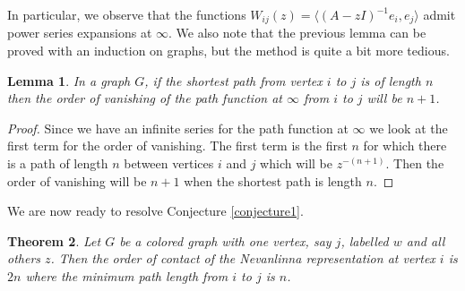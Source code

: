 \documentclass[12pt]{amsart}
\newtheorem{theorem}{Theorem}[section]
\newtheorem{lemma}[theorem]{Lemma}
\theoremstyle{remark}
\newcommand{\inv}{^{-1}}
\numberwithin{equation}{section}
\begin{document}
In particular, we observe that the functions $W_{ij}(z) = \langle (A - zI)\inv e_i, e_j \rangle$ admit power series expansions at $\infty$. We also note that the previous lemma can be proved with an induction on graphs, but the method is quite a bit more tedious. 

\begin{lemma} \label{pathorder}
    In a graph $G$, if the shortest path from vertex $i$ to $j$ is of length $n$ then the order of vanishing of the path function at $\infty$ from $i$ to $j$ will be $n+1$.
\end{lemma}

\begin{proof}
    Since we have an infinite series for the path function at $\infty$ we look at the first term for the order of vanishing. The first term is the first $n$ for which there is a path of length $n$ between vertices $i$ and $j$ which will be $z^{-(n+1)}$. Then the order of vanishing will be $n+1$ when the shortest path is length $n$.
\end{proof}


We are now ready to resolve Conjecture \ref{conjecture1}.

\begin{theorem}\label{contactorder}
Let $G$ be a colored graph with one vertex, say $j$, labelled $w$ and all others $z$. Then the order of contact of the Nevanlinna representation at vertex $i$ is $2n$ where the minimum path length from $i$ to $j$ is $n$.
\end{theorem}
\end{document}
